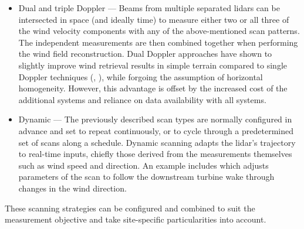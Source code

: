 \begin{itemize}
\item Dual and triple Doppler --- Beams from multiple separated lidars can be intersected in space (and ideally time) to measure either two or all three of the wind velocity components with any of the above-mentioned scan patterns. The independent measurements are then combined together when performing the wind field reconstruction. Dual Doppler approaches have shown to slightly improve wind retrieval results in simple terrain compared to single Doppler techniques (\cite{simon_comparison_2016}, \cite{floors_report_2016}), while forgoing the assumption of horizontal homogeneity. However, this advantage is offset by the increased cost of the additional systems and reliance on data availability with all systems.

\item Dynamic --- The previously described scan types are normally configured in advance and set to repeat continuously, or to cycle through a predetermined set of scans along a schedule. Dynamic scanning adapts the lidar's trajectory to real-time inputs, chiefly those derived from the measurements themselves such as wind speed and direction. An example includes \cite{wildmann_wind_2018} which adjusts parameters of the scan to follow the downstream turbine wake through changes in the wind direction.

\end{itemize}

These scanning strategies can be configured and combined to suit the measurement objective and take site-specific particularities into account.

\clearpage